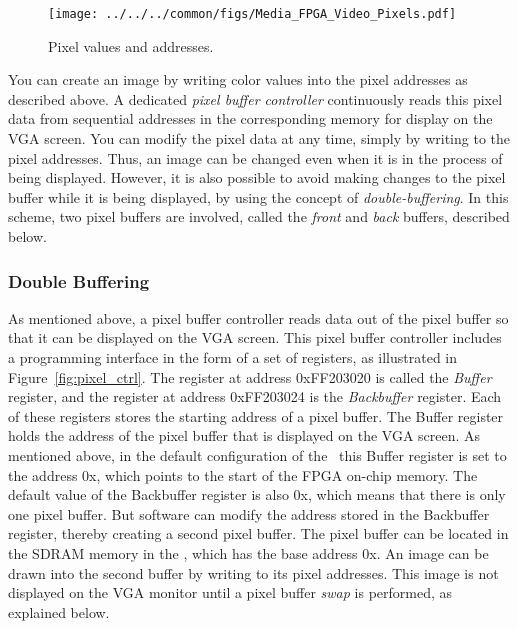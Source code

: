 \begin{figure}[h!]
   \begin{center}
       \texttt{[image: ../../../common/figs/Media\_FPGA\_Video\_Pixels.pdf]}
   \end{center}
   \caption{Pixel values and addresses.}
	\label{fig:pixels}
\end{figure}

You can create an image by writing color values into the pixel addresses as described
above. A dedicated {\it pixel buffer controller} continuously reads this pixel 
data from sequential addresses in the corresponding
memory for display on the VGA screen.  You can modify the pixel data at any time, simply
by writing to the pixel addresses. Thus, an image can be changed even when it is in the
process of being displayed.  However, it is also possible to avoid making changes to 
the pixel buffer while it is being displayed, by using the concept of {\it
double-buffering}.  In this scheme, two pixel buffers are involved, called the {\it front} 
and {\it back} buffers, described below.

\subsubsection{Double Buffering}
\label{sec:double_buffer}

As mentioned above, a pixel buffer controller reads data out of the pixel buffer so that it 
can be displayed on the VGA screen. This pixel buffer controller 
includes a programming interface in the form of a set of registers, as
illustrated in Figure~\ref{fig:pixel_ctrl}. The register at address {\sf 0xFF203020} is called 
the {\it Buffer} register, and the register at address  {\sf 0xFF203024} is the 
{\it Backbuffer} register. Each of these registers stores the starting address of a pixel 
buffer.  The Buffer register holds the address of the pixel buffer that is displayed on
the VGA screen. As mentioned above, in the default configuration of the \systemName~this 
Buffer register is set to the address {\sf 0x}, which points to the start of the FPGA 
on-chip memory.  The default value of the Backbuffer register is also {\sf 0x},
which means that there is only one pixel buffer. But software can modify the address
stored in the Backbuffer register, thereby creating a second pixel buffer. The pixel
buffer can be located in the SDRAM memory in the \systemName, which has 
the base address {\sf 0x}. An image can be drawn into the second buffer by writing to its pixel addresses.
This image is not displayed on the VGA monitor until a pixel buffer {\it swap} is performed, 
as explained below.

